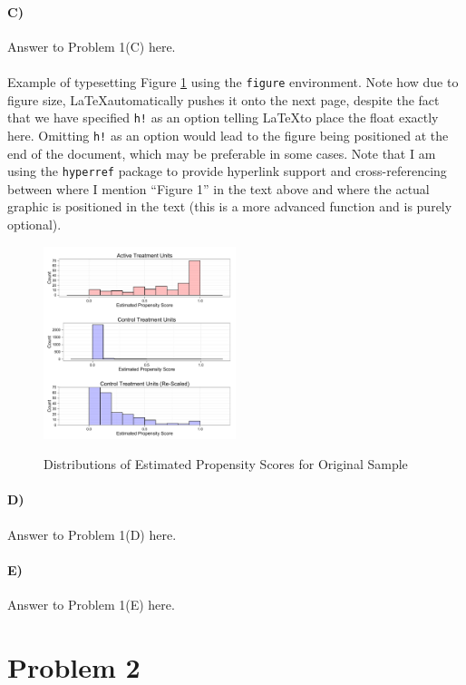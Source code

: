 \documentclass[10pt,letter]{article}
\begin{document}
\paragraph{C)} Answer to Problem 1(C) here.
\\
\\
Example of typesetting Figure \ref{fig:myfigure} using the \verb/figure/ environment. Note how due to figure size,
\LaTeX\phantom{a}automatically pushes it onto the next page, despite
the fact that we have specified \verb/h!/ as an option telling
\LaTeX\phantom{a}to place the float exactly here. Omitting \verb/h!/
as an option would lead to the figure being positioned at the end of
the document, which may be preferable in some cases. Note that I am
using the \verb/hyperref/ package to provide hyperlink support and
cross-referencing between where I mention ``Figure 1'' in the text
above and where the actual graphic is
positioned in the text (this is a more advanced function and is purely optional).
\begin{figure}[h!]
  \centering
  \caption{Distributions of Estimated Propensity Scores for Original Sample}
  \includegraphics[width=0.5\textwidth]{propscore-ex.pdf}
\label{fig:myfigure}
\end{figure}

\paragraph{D)} Answer to Problem 1(D) here.

\paragraph{E)} Answer to Problem 1(E) here.


\section*{Problem 2}
\end{document}
